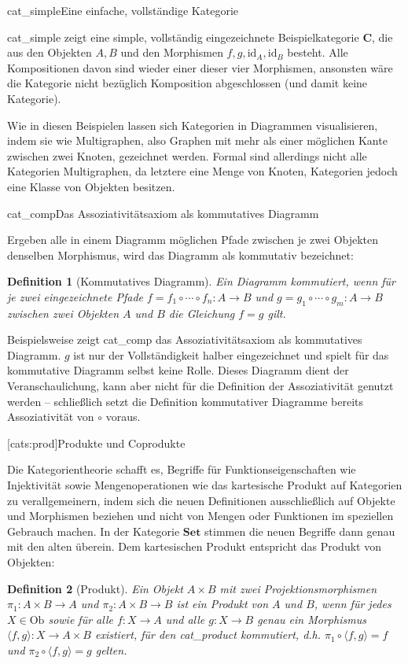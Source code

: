\documentclass[12pt, a4paper, bibgerm]{scrbook}
\newcommand\lsection{}
\newcommand\abb{}
\newcommand\fig{}
\newcommand\ato{\rightarrow} %
\newtheorem{defini}{Definition}
\newcommand{\defi}[2]{%
  \begin{defini}[#1]
    \label{def:#1}
    #2
  \end{defini}
}
\begin{document}
\fig{cat_simple}{Eine einfache, vollständige Kategorie}

\abb{cat_simple} zeigt eine simple, vollständig eingezeichnete
Beispielkategorie $\mathbf{C}$, die aus den Objekten $A, B$ und den
Morphismen $f, g, \mathrm{id}_A, \mathrm{id}_B$ besteht. Alle
Kompositionen davon sind wieder einer dieser vier Morphismen, ansonsten
wäre die Kategorie nicht bezüglich Komposition abgeschlossen (und damit keine
Kategorie).

Wie in diesen Beispielen lassen sich Kategorien in Diagrammen
visualisieren, indem sie wie Multigraphen, also Graphen mit mehr als
einer möglichen Kante zwischen zwei Knoten, gezeichnet werden. Formal
sind allerdings nicht alle Kategorien Multigraphen, da letztere eine
Menge von Knoten, Kategorien jedoch eine Klasse von Objekten besitzen.

\fig{cat_comp}{Das Assoziativitätsaxiom als kommutatives Diagramm}

Ergeben alle in einem Diagramm möglichen Pfade zwischen je zwei Objekten
denselben Morphismus, wird das Diagramm als kommutativ bezeichnet:
\defi{Kommutatives Diagramm}{ Ein Diagramm kommutiert, wenn für je zwei
  eingezeichnete Pfade $f=f_1 \circ \cdots \circ f_n : A \rightarrow B$
  und $g=g_1 \circ \cdots \circ g_m : A \rightarrow B$ zwischen zwei
  Objekten $A$ und $B$ die Gleichung $f=g$ gilt.  }
Beispielsweise zeigt \abb{cat_comp} das Assoziativitätsaxiom als
kommutatives Diagramm. $g$ ist nur der Vollständigkeit halber
eingezeichnet und spielt für das kommutative Diagramm selbst keine
Rolle. Dieses Diagramm dient der Veranschaulichung, kann aber nicht für
die Definition der Assoziativität genutzt werden -- schließlich setzt die
Definition kommutativer Diagramme bereits Assoziativität von $\circ$
voraus.

\lsection[cats:prod]{Produkte und Coprodukte}

Die Kategorientheorie schafft es, Begriffe für Funktionseigenschaften
wie Injektivität sowie Mengenoperationen wie das kartesische Produkt auf
Kategorien zu verallgemeinern, indem sich die neuen Definitionen
ausschließlich auf Objekte und Morphismen beziehen und nicht von Mengen
oder Funktionen im speziellen Gebrauch machen. In der Kategorie
$\mathbf{Set}$ stimmen die neuen Begriffe dann genau mit den alten
überein. Dem kartesischen Produkt entspricht das Produkt von Objekten:

\defi{Produkt}{ Ein Objekt $A \times B$ mit zwei Projektionsmorphismen
  $\pi_1 : A \times B \ato A$ und $\pi_2 : A \times B \ato B$ ist ein
  Produkt von $A$ und $B$, wenn für jedes $X \in \mathrm{Ob}$ sowie für
  alle $f : X \ato A$ und alle $g : X \ato B$ genau ein Morphismus
  $\langle f,g \rangle : X \ato A \times B$ existiert, für den
  \abb{cat_product} kommutiert, d.h.  $\pi_1 \circ \langle f,g \rangle =
  f$ und $\pi_2 \circ \langle f,g \rangle = g$ gelten.}
\end{document}
